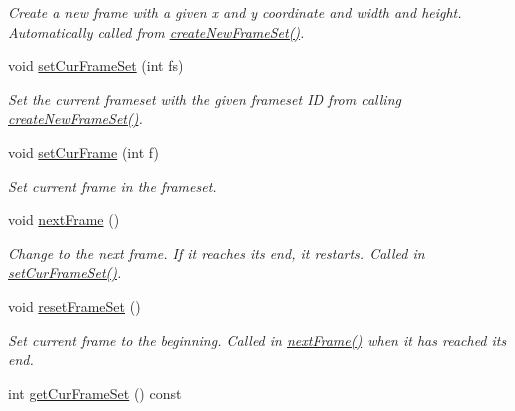 \begin{DoxyCompactItemize}
\begin{DoxyCompactList}\small\item\em Create a new frame with a given x and y coordinate and width and height. Automatically called from \hyperlink{classObject_a21238c368f570c14722cb00b74353732}{create\+New\+Frame\+Set()}. \end{DoxyCompactList}\item 
void \hyperlink{classObject_a061542647f10e3f30565ad9f56dc64c4}{set\+Cur\+Frame\+Set} (int fs)\hypertarget{classObject_a061542647f10e3f30565ad9f56dc64c4}{}\label{classObject_a061542647f10e3f30565ad9f56dc64c4}

\begin{DoxyCompactList}\small\item\em Set the current frameset with the given frameset ID from calling \hyperlink{classObject_a21238c368f570c14722cb00b74353732}{create\+New\+Frame\+Set()}. \end{DoxyCompactList}\item 
void \hyperlink{classObject_aef259fb0225c8995ec2c0ebe04c98cd9}{set\+Cur\+Frame} (int f)\hypertarget{classObject_aef259fb0225c8995ec2c0ebe04c98cd9}{}\label{classObject_aef259fb0225c8995ec2c0ebe04c98cd9}

\begin{DoxyCompactList}\small\item\em Set current frame in the frameset. \end{DoxyCompactList}\item 
void \hyperlink{classObject_a2c123e98f36c3779f5172afefacbf69c}{next\+Frame} ()\hypertarget{classObject_a2c123e98f36c3779f5172afefacbf69c}{}\label{classObject_a2c123e98f36c3779f5172afefacbf69c}

\begin{DoxyCompactList}\small\item\em Change to the next frame. If it reaches its end, it restarts. Called in \hyperlink{classObject_a061542647f10e3f30565ad9f56dc64c4}{set\+Cur\+Frame\+Set()}. \end{DoxyCompactList}\item 
void \hyperlink{classObject_ab2a55c6e2908f754992cc1c281b01be8}{reset\+Frame\+Set} ()\hypertarget{classObject_ab2a55c6e2908f754992cc1c281b01be8}{}\label{classObject_ab2a55c6e2908f754992cc1c281b01be8}

\begin{DoxyCompactList}\small\item\em Set current frame to the beginning. Called in \hyperlink{classObject_a2c123e98f36c3779f5172afefacbf69c}{next\+Frame()} when it has reached its end. \end{DoxyCompactList}\item 
int \hyperlink{classObject_a3de9dd15d8ba28785284bccd2cfc406c}{get\+Cur\+Frame\+Set} () const \hypertarget{classObject_a3de9dd15d8ba28785284bccd2cfc406c}{}\label{classObject_a3de9dd15d8ba28785284bccd2cfc406c}


\end{DoxyCompactItemize}
